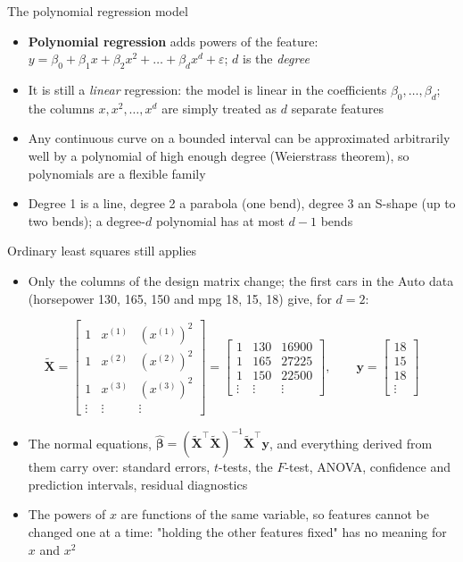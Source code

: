 \begin{frame}{The polynomial regression model}
    \begin{itemize}
        \item \textbf{Polynomial regression} adds powers of the feature: $y = \beta_0 + \beta_1 x + \beta_2 x^2 + \dots + \beta_d x^d + \varepsilon$; $d$ is the \emph{degree}
        \item It is still a \emph{linear} regression: the model is linear in the coefficients $\beta_0, \dots, \beta_d$; the columns $x, x^2, \dots, x^d$ are simply treated as $d$ separate features
        \item Any continuous curve on a bounded interval can be approximated arbitrarily well by a polynomial of high enough degree (Weierstrass theorem), so polynomials are a flexible family
        \item Degree 1 is a line, degree 2 a parabola (one bend), degree 3 an S-shape (up to two bends); a degree-$d$ polynomial has at most $d-1$ bends
    \end{itemize}
\end{frame}


\begin{frame}{Ordinary least squares still applies}
    \begin{itemize}
        \item Only the columns of the design matrix change; the first cars in the Auto data (horsepower 130, 165, 150 and mpg 18, 15, 18) give, for $d = 2$:
    \end{itemize}
    \[
        \tilde{\mathbf{X}} = \begin{bmatrix} 1 & x^{(1)} & (x^{(1)})^2 \\ 1 & x^{(2)} & (x^{(2)})^2 \\ 1 & x^{(3)} & (x^{(3)})^2 \\ \vdots & \vdots & \vdots \end{bmatrix} = \begin{bmatrix} 1 & 130 & 16900 \\ 1 & 165 & 27225 \\ 1 & 150 & 22500 \\ \vdots & \vdots & \vdots \end{bmatrix}, \qquad \mathbf{y} = \begin{bmatrix} 18 \\ 15 \\ 18 \\ \vdots \end{bmatrix}
    \]
    \begin{itemize}
        \item The normal equations, $\hat{\symbf{\beta}} = (\tilde{\mathbf{X}}^\top \tilde{\mathbf{X}})^{-1} \tilde{\mathbf{X}}^\top \mathbf{y}$, and everything derived from them carry over: standard errors, $t$-tests, the $F$-test, ANOVA, confidence and prediction intervals, residual diagnostics
        \item The powers of $x$ are functions of the same variable, so features cannot be changed one at a time: "holding the other features fixed" has no meaning for $x$ and $x^2$
    \end{itemize}
\end{frame}


